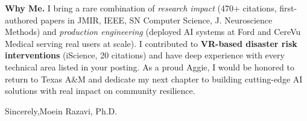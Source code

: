 \documentclass[11pt,letterpaper]{article}
\begin{document}
\noindent\textbf{\color{headerblue}Why Me.}\enspace
I bring a rare combination of \textit{research impact} (470+ citations, first-authored papers in JMIR, IEEE, SN Computer Science, J. Neuroscience Methods) and \textit{production engineering} (deployed AI systems at Ford and CereVu Medical serving real users at scale). I contributed to \textbf{VR-based disaster risk interventions} (iScience, 20 citations) and have deep experience with every technical area listed in your posting. As a proud Aggie, I would be honored to return to Texas A\&M and dedicate my next chapter to building cutting-edge AI solutions with real impact on community resilience.

\vspace{0.5em}

\noindent Sincerely,\enspace Moein Razavi, Ph.D.
\end{document}
